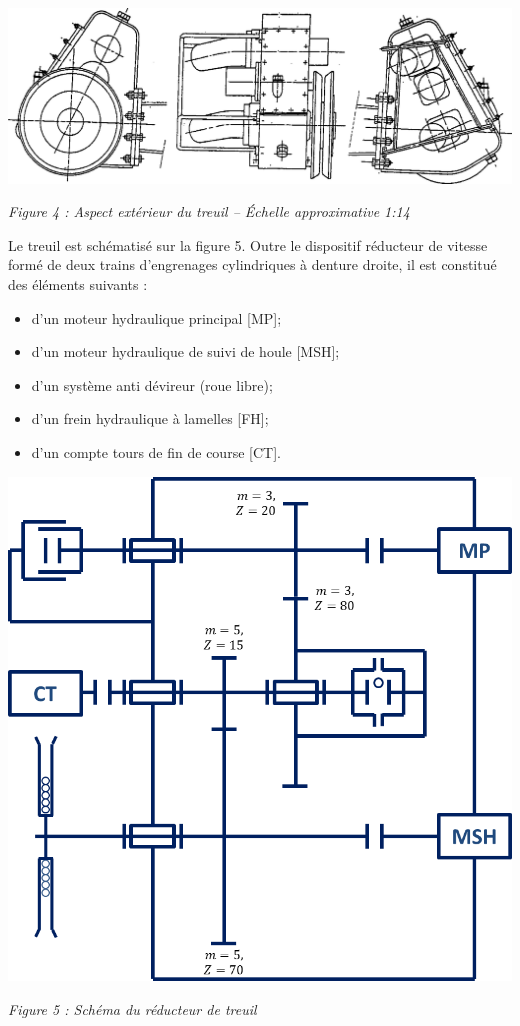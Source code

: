 \documentclass[10pt]{article}
\begin{document}
\begin{center}
\includegraphics[width=.95\textwidth]{images/Treuil}

\textit{Figure 4 : Aspect extérieur du treuil -- Échelle approximative 1:14}
\end{center}

\begin{minipage}[c]{.49\linewidth}
Le treuil est schématisé sur la figure 5. Outre le dispositif réducteur de vitesse formé de deux trains d'engrenages cylindriques à denture droite, il est constitué des éléments suivants : 
\begin{itemize}
\item d'un moteur hydraulique principal [MP];
\item d'un moteur hydraulique de suivi de houle [MSH];
\item d'un système anti dévireur (roue libre);
\item d'un frein hydraulique à lamelles [FH];
\item d'un compte tours de fin de course [CT].
\end{itemize}

\end{minipage} \hfill
\begin{minipage}[c]{.49\linewidth}
\begin{center}
\includegraphics[width=.8\textwidth]{images/schema}

\textit{Figure 5 : Schéma du réducteur de treuil}
\end{center}
\end{minipage} 
\end{document}
